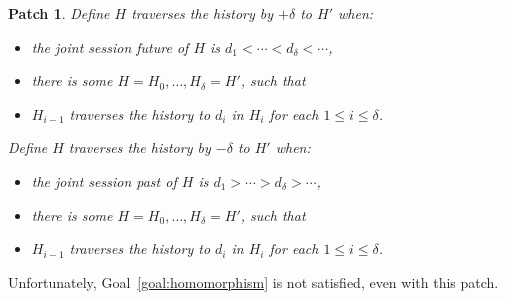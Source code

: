 \documentclass{notes}
\newcommand{\aNH}{H}
\newcommand{\ltChron}{<}
\newcommand{\gtChron}{>}
\newcommand{\aDoc}{d}
\newtheorem{patch}{Patch}
\begin{document}
\begin{patch}
Define \emph{$\aNH$ traverses the history by $+\delta$ to $\aNH'$} when:
\begin{itemize}
\item the joint session future of $\aNH$ is $\aDoc_1 \ltChron \cdots \ltChron \aDoc_\delta \ltChron \cdots$,
\item there is some $\aNH=\aNH_0,\ldots,\aNH_\delta=\aNH'$, such that
\item $H_{i-1}$ traverses the history to $d_i$ in $H_i$ for each $1 \le i \le \delta$.
\end{itemize}
Define \emph{$\aNH$ traverses the history by $-\delta$ to $\aNH'$} when:
\begin{itemize}
\item the joint session past of $\aNH$ is $\aDoc_1 \gtChron \cdots \gtChron \aDoc_\delta \gtChron \cdots$,
\item there is some $\aNH=\aNH_0,\ldots,\aNH_\delta=\aNH'$, such that
\item $H_{i-1}$ traverses the history to $d_i$ in $H_i$ for each $1 \le i \le \delta$.
\end{itemize}
\end{patch}
Unfortunately, Goal~\ref{goal:homomorphism} is not satisfied,
even with this patch.
\end{document}
